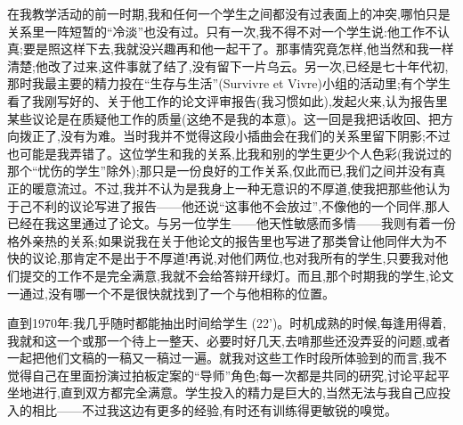 在我教学活动的前一时期,我和任何一个学生之间都没有过表面上的冲突,哪怕只是关系里一阵短暂的“冷淡”也没有过。只有一次,我不得不对一个学生说:他工作不认真;要是照这样下去,我就没兴趣再和他一起干了。那事情究竟怎样,他当然和我一样清楚;他改了过来,这件事就了结了,没有留下一片乌云。另一次,已经是七十年代初,那时我最主要的精力投在“生存与生活”(Survivre et Vivre)小组的活动里;有个学生看了我刚写好的、关于他工作的论文评审报告(我习惯如此),发起火来,认为报告里某些议论是在质疑他工作的质量(这绝不是我的本意)。这一回是我把话收回、把方向拨正了,没有为难。当时我并不觉得这段小插曲会在我们的关系里留下阴影;不过也可能是我弄错了。这位学生和我的关系,比我和别的学生更少个人色彩(我说过的那个“忧伤的学生”除外);那只是一份良好的工作关系,仅此而已,我们之间并没有真正的暖意流过。不过,我并不认为是我身上一种无意识的不厚道,使我把那些他认为于己不利的议论写进了报告——他还说“这事他不会放过”,不像他的一个同伴,那人已经在我这里通过了论文。与另一位学生——他天性敏感而多情——我则有着一份%
格外亲热的关系;如果说我在关于他论文的报告里也写进了那类曾让他同伴大为不快的议论,那肯定不是出于不厚道!再说,对他们两位,也对我所有的学生,只要我对他们提交的工作不是完全满意,我就不会给答辩开绿灯。而且,那个时期我的学生,论文一通过,没有哪一个不是很快就找到了一个与他相称的位置。

直到1970年:我几乎随时都能抽出时间给学生 (22')。时机成熟的时候,每逢用得着,我就和这一个或那一个待上一整天、必要时好几天,去啃那些还没弄妥的问题,或者一起把他们文稿的一稿又一稿过一遍。就我对这些工作时段所体验到的而言,我不觉得自己在里面扮演过拍板定案的“导师”角色;每一次都是共同的研究,讨论平起平坐地进行,直到双方都完全满意。学生投入的精力是巨大的,当然无法与我自己应投入的相比——不过我这边有更多的经验,有时还有训练得更敏锐的嗅觉。

